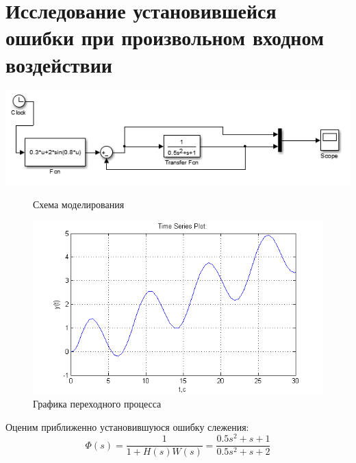 \documentclass[a4paper, 11pt]{article}
\begin{document}
\section{Исследование установившейся ошибки при произвольном входном воздействии}

\begin{center}
		\includegraphics[width=0.7\linewidth]{14}
	\begin{figure}
		\centering
	
		\caption{Схема моделирования}
		\label{fig:14}
	\end{figure}
\end{center}

\begin{figure}
	\centering
	\includegraphics[width=0.7\linewidth]{15}
	\caption{Графика переходного процесса}
	\label{fig:15}
\end{figure}

Оценим приближенно установившуюся ошибку слежения:
\[\varPhi(s) = \frac{1}{{1 + H(s)W(s)}} = \frac{{0.5{s^2} + s + 1}}{{0.5{s^2} + s + 2}}\]
\end{document}
